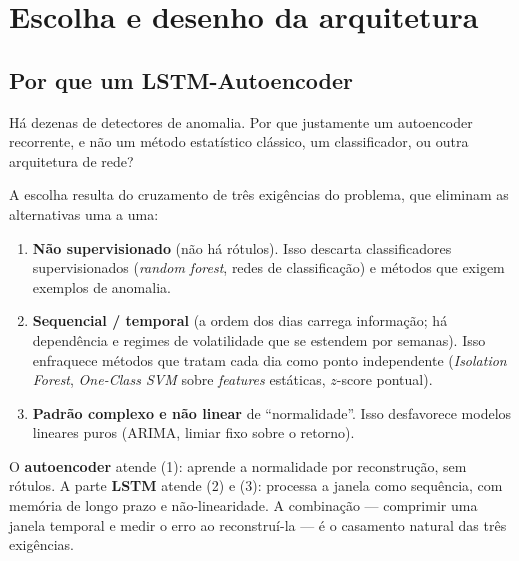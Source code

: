 \section{Escolha e desenho da arquitetura}
\label{sec:debate-arq}

\subsection{Por que um LSTM-Autoencoder}
\label{sec:debate-arq-lstmae}

\begin{confronto}
Há dezenas de detectores de anomalia. Por que justamente um autoencoder
recorrente, e não um método estatístico clássico, um classificador, ou outra
arquitetura de rede?
\end{confronto}

A escolha resulta do cruzamento de três exigências do problema, que eliminam as
alternativas uma a uma:

\begin{enumerate}[noitemsep]
  \item \textbf{Não supervisionado} (não há rótulos). Isso descarta classificadores
        supervisionados (\emph{random forest}, redes de classificação) e métodos
        que exigem exemplos de anomalia.
  \item \textbf{Sequencial / temporal} (a ordem dos dias carrega informação; há
        dependência e regimes de volatilidade que se estendem por semanas). Isso
        enfraquece métodos que tratam cada dia como ponto independente
        (\emph{Isolation Forest}, \emph{One-Class SVM} sobre \emph{features}
        estáticas, $z$-score pontual).
  \item \textbf{Padrão complexo e não linear} de ``normalidade''. Isso desfavorece
        modelos lineares puros (ARIMA, limiar fixo sobre o retorno).
\end{enumerate}

O \textbf{autoencoder} atende (1): aprende a normalidade por reconstrução, sem
rótulos. A parte \textbf{LSTM} atende (2) e (3): processa a janela como sequência,
com memória de longo prazo e não-linearidade. A combinação --- comprimir uma
janela temporal e medir o erro ao reconstruí-la --- é o casamento natural das
três exigências.

